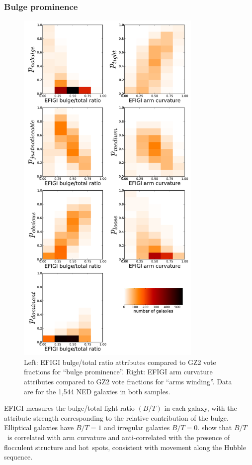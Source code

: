 \documentclass[useAMS,usenatbib]{mn2e}
\newcommand{\bt}{$B/T$}
\begin{document}
\subsubsection{Bulge prominence}

\begin{figure}
\includegraphics[angle=0,width=3.5in]{figures/efigi_bulgearms.pdf}
\caption{Left: EFIGI bulge/total ratio attributes compared to GZ2 vote fractions for ``bulge prominence''. Right: EFIGI arm curvature attributes compared to GZ2 vote fractions for ``arms winding''. Data are for the 1,544 NED galaxies in both samples.  
\label{fig-efigi_bulgearms}}
\end{figure}

EFIGI measures the bulge/total light ratio $(B/T)$ in each galaxy, with the attribute strength corresponding to the relative contribution of the bulge. Elliptical galaxies have $B/T=1$ and irregular galaxies $B/T=0$. \citet{bai11} show that \bt~is correlated with arm curvature and anti-correlated with the presence of flocculent structure and hot~spots, consistent with movement along the Hubble sequence.  
\end{document}

